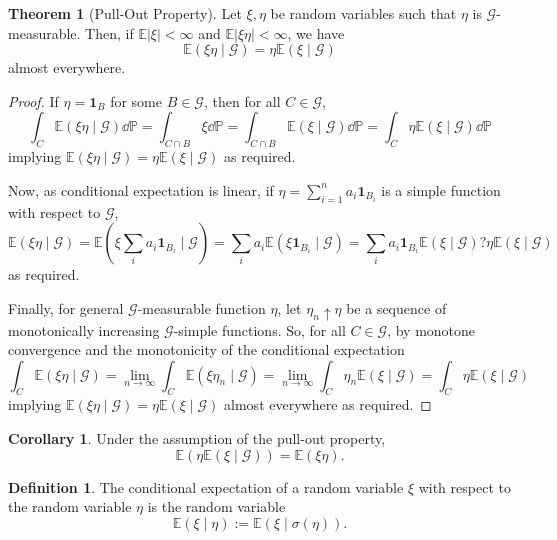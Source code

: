 \documentclass[]{article}
\theoremstyle{definition}
\newtheorem{theorem}{Theorem}
\newtheorem{corollary}{Corollary}[theorem]
\theoremstyle{definition}
\newtheorem{definition}{Definition}[section]
\begin{document}
\begin{theorem}[Pull-Out Property]
  Let \(\xi, \eta\) be random variables such that \(\eta\) is 
  \(\mathcal{G}\)-measurable. Then, if \(\mathbb{E}|\xi| < \infty\) and 
  \(\mathbb{E}|\xi \eta| < \infty\), we have 
  \[\mathbb{E}(\xi\eta \mid \mathcal{G}) = \eta\mathbb{E}(\xi \mid \mathcal{G})\]
  almost everywhere.
\end{theorem}
\begin{proof}
  If \(\eta = \mathbf{1}_B\) for some \(B \in \mathcal{G}\), then for all 
  \(C \in \mathcal{G}\),
  \[\int_C \mathbb{E}(\xi\eta \mid \mathcal{G}) \dd \mathbb{P} = 
    \int_{C \cap B} \xi \dd \mathbb{P} = 
    \int_{C \cap B} \mathbb{E}(\xi \mid \mathcal{G}) \dd \mathbb{P} = 
    \int_C \eta \mathbb{E}(\xi \mid \mathcal{G}) \dd \mathbb{P}\]
  implying \(\mathbb{E}(\xi\eta \mid \mathcal{G}) = \eta\mathbb{E}(\xi \mid \mathcal{G})\) 
  as required. 

  Now, as conditional expectation is linear, if \(\eta = \sum_{i = 1}^n a_i \mathbf{1}_{B_i}\) 
  is a simple function with respect to \(\mathcal{G}\), 
  \[\mathbb{E} (\xi\eta \mid \mathcal{G}) = 
    \mathbb{E} \left(\xi \sum_i a_i \mathbf{1}_{B_i} \mid \mathcal{G}\right) = 
    \sum_i a_i\mathbb{E}(\xi \mathbf{1}_{B_i} \mid \mathcal{G}) = 
    \sum_i a_i \mathbf{1}_{B_i} \mathbb{E}(\xi \mid \mathcal{G})? 
    \eta \mathbb{E}(\xi \mid \mathcal{G})\]
  as required.
  
  Finally, for general \(\mathcal{G}\)-measurable function \(\eta\), let 
  \(\eta_n \uparrow \eta\) be a sequence of monotonically increasing 
  \(\mathcal{G}\)-simple functions. So, for all \(C \in \mathcal{G}\), 
  by monotone convergence and the monotonicity of the conditional expectation
  \[\int_C \mathbb{E}(\xi\eta \mid \mathcal{G}) = 
  \lim_{n \to \infty} \int_C \mathbb{E}(\xi \eta_n \mid \mathcal{G}) = 
  \lim_{n \to \infty} \int_C \eta_n \mathbb{E}(\xi\mid \mathcal{G}) = 
  \int_C \eta \mathbb{E}(\xi \mid \mathcal{G})\]
  implying \(\mathbb{E}(\xi\eta \mid \mathcal{G}) = \eta\mathbb{E}(\xi \mid \mathcal{G})\) 
  almost everywhere as required.
\end{proof}

\begin{corollary}
  Under the assumption of the pull-out property, 
  \[\mathbb{E}(\eta\mathbb{E}(\xi \mid \mathcal{G})) = \mathbb{E}(\xi \eta).\]
\end{corollary}

\begin{definition}
  The conditional expectation of a random variable \(\xi\) with respect to the 
  random variable \(\eta\) is the random variable
  \[\mathbb{E}(\xi \mid \eta) := \mathbb{E}(\xi \mid \sigma(\eta)).\]
\end{definition}
\end{document}
